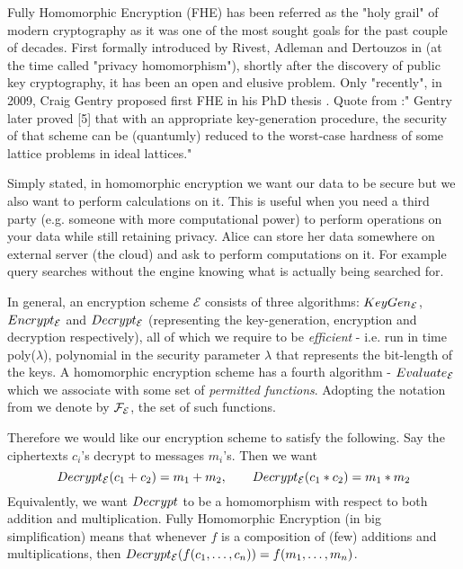 Fully Homomorphic Encryption (FHE) has been referred as the "holy grail" of modern cryptography as it was one of the most sought goals for the past couple of decades. First formally introduced by Rivest, Adleman and Dertouzos in \cite{primal} (at the time called "privacy homomorphism"), shortly after the discovery of public key cryptography, it has been an open and elusive problem. Only "recently", in 2009, Craig Gentry proposed first FHE in his PhD thesis \cite{gentry_phd}. Quote from \cite{impl_gentry}:"  Gentry later proved [5] that with an appropriate key-generation procedure, the security of that scheme can be (quantumly) reduced to the worst-case hardness of some lattice problems in ideal lattices."

Simply stated, in homomorphic encryption we want our data to be secure but we also want to perform calculations on it. This is useful when you need a third party (e.g. someone with more computational power) to perform operations on your data while still retaining privacy. Alice can store her data somewhere on external server (the cloud) and ask to perform computations on it. For example query searches without the engine knowing what is actually being searched for.

\begin{remark} \label{algs}
    In general, an encryption scheme $\mathcal{E}$ consists of three algorithms: $KeyGen_{\mathcal{E}}$, $Encrypt_{\mathcal{E}}$ and $Decrypt_{\mathcal{E}}$ (representing the key-generation, encryption and decryption respectively), all of which we require to be \textit{efficient} - i.e. run in time poly($\lambda$), polynomial in the security parameter $\lambda$ that represents the bit-length of the keys. A homomorphic encryption scheme has a fourth algorithm - $Evaluate_{\mathcal{E}}$ which we associate with some set of \textit{permitted functions}. Adopting the notation from \cite{easy_fhe} we denote by $\mathcal{F}_{\mathcal{E}}$, the set of such functions.
\end{remark}

Therefore we would like our encryption scheme to satisfy the following. Say the ciphertexts $c_i$'s decrypt to messages $m_i$'s. Then we want
$$ Decrypt_{\mathcal{E}}(c_1 + c_2) = m_1 + m_2, \qquad Decrypt_{\mathcal{E}}(c_1*c_2) = m_1*m_2$$
Equivalently, we want $Decrypt$ to be a homomorphism with respect to both addition and multiplication. Fully Homomorphic Encryption (in big simplification) means that whenever $f$ is a composition of (few) additions and multiplications, then $Decrypt_{\mathcal{E}}(f(c_1, \dots, c_n)) = f(m_1, \dots, m_n)$. \\

